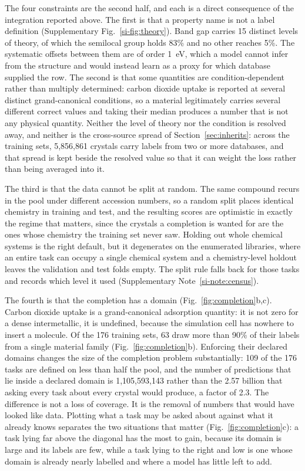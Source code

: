 The four constraints are the second half, and each is a direct consequence of
the integration reported above. The first is that a property name is not a label
definition
(Supplementary Fig.~\ref{si-fig:theory}).
Band gap carries 15 distinct levels of theory, of which the semilocal group holds
83\% and no other reaches 5\%. The systematic offsets between them
are of order 1~eV, which a model cannot infer from the structure and would
instead learn as a proxy for which database supplied the row. The second is that
some quantities are condition-dependent rather than multiply determined: carbon
dioxide uptake is reported at several distinct grand-canonical conditions, so a
material legitimately carries several different correct values and taking their
median produces a number that is not any physical quantity. Neither the level of
theory nor the condition is resolved away, and neither is the cross-source spread
of Section~\ref{sec:inherits}: across the training sets, 5{,}856{,}861 crystals
carry labels from two or more databases, and that spread is kept beside the
resolved value so that it can weight the loss rather than being averaged into
it.

The third is that the data cannot be split at random. The same compound
recurs in the pool under different accession numbers, so a random split places
identical chemistry in training and test, and the resulting scores are optimistic
in exactly the regime that matters, since the crystals a completion is wanted for
are the ones whose chemistry the training set never saw. Holding out whole
chemical systems is the right default, but it degenerates on the enumerated
libraries, where an entire task can occupy a single chemical system and a
chemistry-level holdout leaves the validation and test folds empty. The split
rule falls back for those tasks and records which level it used
(Supplementary Note~\ref{si-note:census}).

The fourth is that the completion has a domain (Fig.~\ref{fig:completion}b,c).
Carbon dioxide uptake is a grand-canonical adsorption quantity: it is not zero for a
dense intermetallic, it is undefined, because the simulation cell has nowhere to
insert a molecule. Of the 176 training sets, 63 draw more than 90\% of their
labels from a single material family (Fig.~\ref{fig:completion}b). Enforcing
their declared domains changes the size of the completion problem substantially: 109 of
the 176 tasks are defined on less than half the pool, and the number of
predictions that lie inside a declared domain is 1{,}105{,}593{,}143 rather than
the 2.57 billion that asking every task about every crystal would produce, a
factor of 2.3. The difference is not a loss of coverage. It is the removal of numbers
that would have looked like data. Plotting what a task may be asked about against
what it already knows separates the two situations that matter
(Fig.~\ref{fig:completion}c): a task lying far above the diagonal has the most to
gain, because its domain is large and its labels are few, while a task lying to
the right and low is one whose domain is already nearly labelled and where a
model has little left to add.

